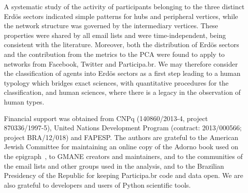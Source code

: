 \documentclass[%
	aip,
	jmp,%
	amsmath,amssymb,
	reprint,%
]{revtex4-1}
\begin{document}
A systematic study of the activity of participants belonging to the three distinct Erd\"os sectors indicated simple patterns for hubs and peripheral vertices, while the network structure was governed by the intermediary vertices. These properties were shared by all email lists and were time-independent, being consistent with the literature. Moreover, both the distribution of Erd\"os sectors and the contribution from the metrics to the PCA were found to apply to networks from Facebook, Twitter and Participa.br. We may therefore consider the classification of agents into Erd\"os sectors as a first step leading to a human typology which bridges exact sciences, with quantitative procedures for the classification, and human sciences, where there is a legacy in the observation of human types. 


\begin{acknowledgments}
	Financial support was obtained from CNPq (140860/2013-4,
	project 870336/1997-5), United Nations Development Program (contract: 2013/000566; project BRA/12/018) and FAPESP. 
	The authors are grateful to the American Jewish Committee for maintaining an online copy of the Adorno book used on the epigraph~\cite{adorno}, to GMANE creators and maintainers, and to the communities of the email lists and other groups used in the analysis, and to the Brazilian Presidency of the Republic for keeping Participa.br code and data open.
	We are also grateful to developers and users of Python scientific tools.
\end{acknowledgments}


\end{document}
